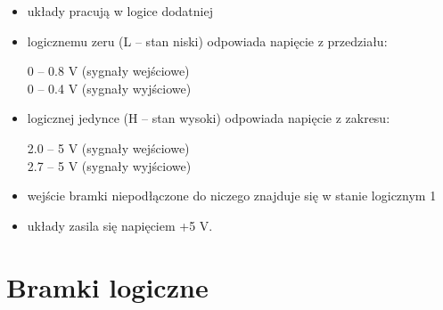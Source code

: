 \begin{itemize}
    \item układy pracują w logice dodatniej
    \item logicznemu zeru (L – stan niski) odpowiada napięcie z przedziału:
        \begin{center}
             0 – 0.8 V (sygnały wejściowe) \\
             0 – 0.4 V (sygnały wyjściowe)
        \end{center}
    \item logicznej jedynce (H – stan wysoki) odpowiada napięcie z zakresu:
        \begin{center}
            2.0 – 5 V (sygnały wejściowe) \\
            2.7 – 5 V (sygnały wyjściowe)
        \end{center}
    \item wejście bramki niepodłączone do niczego znajduje się w stanie logicznym 1
    \item układy zasila się napięciem +5 V.
\end{itemize}

\pagebreak

\section{Bramki logiczne}


